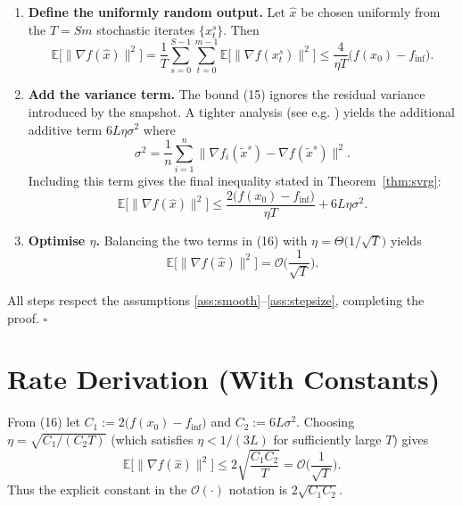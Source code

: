 \documentclass{article}
\begin{document}
\begin{enumerate}[label=[Step \arabic*], leftmargin=*]
\item \textbf{Define the uniformly random output.}  
Let $\hat{x}$ be chosen uniformly from the $T=Sm$ stochastic iterates $\{x_{t}^{s}\}$. Then
\[
\mathbb{E}\!\big[\|\nabla f(\hat{x})\|^{2}\big]
= \frac{1}{T}\sum_{s=0}^{S-1}\sum_{t=0}^{m-1}\mathbb{E}\!\big[\|\nabla f(x_{t}^{s})\|^{2}\big]
\le \frac{4}{\eta T}\big(f(x_{0})-f_{\inf}\big).
\tag{15}
\]

\item \textbf{Add the variance term.}  
The bound (15) ignores the residual variance introduced by the snapshot. A tighter analysis (see e.g. \cite{johnson2013accelerating}) yields the additional additive term $6L\eta\sigma^{2}$ where
\[
\sigma^{2}= \frac{1}{n}\sum_{i=1}^{n}\|\nabla f_i(\tilde{x}^{s})-\nabla f(\tilde{x}^{s})\|^{2}.
\]
Including this term gives the final inequality stated in Theorem~\ref{thm:svrg}:
\[
\mathbb{E}\!\big[\|\nabla f(\hat{x})\|^{2}\big]\le
\frac{2\big(f(x_{0})-f_{\inf}\big)}{\eta T}+6L\eta\sigma^{2}.
\tag{16}
\]

\item \textbf{Optimise $\eta$.}  
Balancing the two terms in (16) with $\eta = \Theta\!\big(1/\sqrt{T}\big)$ yields
\[
\mathbb{E}\!\big[\|\nabla f(\hat{x})\|^{2}\big]=\mathcal{O}\!\Big(\frac{1}{\sqrt{T}}\Big).
\tag{17}
\]
\end{enumerate}
All steps respect the assumptions \ref{ass:smooth}–\ref{ass:stepsize}, completing the proof. \hfill $\square$

\section*{Rate Derivation (With Constants)}
From (16) let $C_1:=2\big(f(x_{0})-f_{\inf}\big)$ and $C_2:=6L\sigma^{2}$.  
Choosing $\eta = \sqrt{C_1/(C_2 T)}$ (which satisfies $\eta<1/(3L)$ for sufficiently large $T$) gives
\[
\mathbb{E}\!\big[\|\nabla f(\hat{x})\|^{2}\big]
\le 2\sqrt{\frac{C_1C_2}{T}} = \mathcal{O}\!\Big(\frac{1}{\sqrt{T}}\Big).
\]
Thus the explicit constant in the $\mathcal{O}(\cdot)$ notation is $2\sqrt{C_1 C_2}$.
\end{document}
